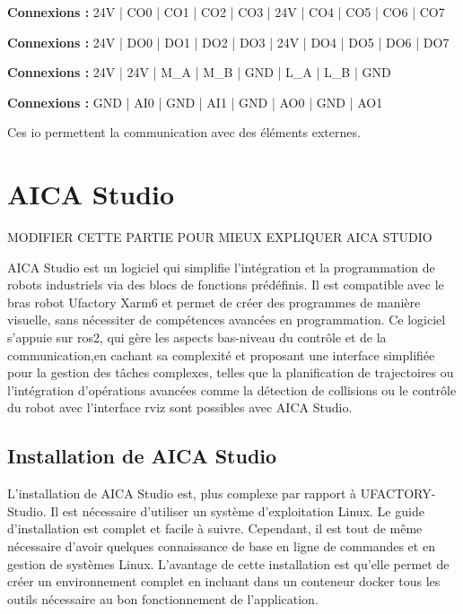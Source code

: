 \begin{tcolorbox}[colframe=black, colback=ConfigOutputColor, title=Configurable Outputs]
    \textbf{Connexions :} 24V | CO0 | CO1 | CO2 | CO3 | 24V | CO4 | CO5 | CO6 | CO7
\end{tcolorbox}

\begin{tcolorbox}[colframe=black, colback=DigitalOutputColor, title=Digital Outputs]
    \textbf{Connexions :} 24V | DO0 | DO1 | DO2 | DO3 | 24V | DO4 | DO5 | DO6 | DO7
\end{tcolorbox}

\begin{tcolorbox}[colframe=black, colback=RS485Color, title=RS485]
    \textbf{Connexions :} 24V | 24V | M\_A | M\_B | GND | L\_A | L\_B | GND
\end{tcolorbox}

\begin{tcolorbox}[colframe=black, colback=AnalogColor, title=Analog]
    \textbf{Connexions :} GND | AI0 | GND | AI1 | GND | AO0 | GND | AO1
\end{tcolorbox}

Ces \gls{io} permettent la communication avec des éléments externes.

\section{AICA Studio}

MODIFIER CETTE PARTIE POUR MIEUX EXPLIQUER AICA STUDIO

AICA Studio est un logiciel qui simplifie l'intégration et la programmation de robots industriels via des blocs de fonctions prédéfinis. Il est compatible avec le bras robot Ufactory Xarm6 et permet de créer des programmes de manière visuelle, sans nécessiter de compétences avancées en programmation. Ce logiciel s'appuie sur \gls{ros2}, qui gère les aspects bas-niveau du contrôle et de la communication,en cachant sa complexité et proposant une interface simplifiée pour la gestion des tâches complexes, telles que la planification de trajectoires ou l'intégration d'opérations avancées comme la détection de collisions ou le contrôle du robot avec l'interface \gls{rviz} sont possibles avec AICA Studio.

\subsection{Installation de AICA Studio}
L'installation de AICA Studio est, plus complexe par rapport à UFACTORY-Studio. Il est nécessaire d'utiliser un système d'exploitation Linux. Le guide d'installation \cite{AICADocs} est complet et facile à suivre. Cependant, il est tout de même nécessaire d'avoir quelques connaissance de base en ligne de commandes et en gestion de systèmes Linux. L'avantage de cette installation est qu'elle permet de créer un environnement complet en incluant dans un \gls{conteneur} \gls{docker} tous les outils nécessaire au bon fonctionnement de l'application.

